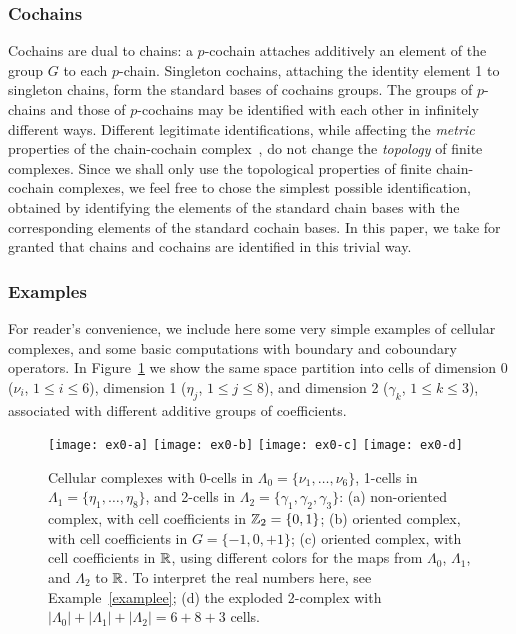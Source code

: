 \subsubsection{{Cochains}}
\label{sec:cochains}

          Cochains are dual to {chains}: a $p$-cochain attaches additively an element of the group $G$ to each $p$-chain. Singleton cochains, attaching the identity element 1 to {singleton chains}, form the standard bases of cochains groups. The groups of $p$-chains and those of $p$-cochains may be identified with each other in {infinitely different ways}. Different legitimate identifications, while affecting the \emph{metric} properties of the chain-cochain complex~\cite{DiCarlo:2009:DPU:1629255.1629273}, do not change the \emph{topology} of finite complexes. Since we shall only use the topological properties of finite chain-cochain complexes, we feel free to chose the simplest possible identification, obtained by identifying the elements of the standard chain bases with the corresponding elements of the standard cochain bases. In this paper, we take for granted that chains and cochains are identified in this trivial way.

\subsubsection{{Examples}}

{
For reader's convenience, we include here some very simple examples of cellular complexes, and some basic computations with boundary and coboundary operators. In Figure~\ref{fig:ex0-abc} we show the same space partition into cells of dimension 0 ($\nu_i$, $1\leq i\leq 6$), dimension 1 ($\eta_j$, $1\leq j\leq 8$), and dimension 2 ($\gamma_k$, $1\leq k\leq 3$), associated with different additive groups of coefficients.
}

\begin{figure}[htbp] %
   \centering
   \texttt{[image: ex0-a]}
   \hfill
   \texttt{[image: ex0-b]}
   \hfill
   \texttt{[image: ex0-c]}
   \hfill
   \texttt{[image: ex0-d]}
   \caption{{
Cellular complexes with 0-cells {in} $\Lambda_0=\{\nu_1, \ldots, \nu_6\}$,  1-cells {in} $\Lambda_1=\{\eta_1, \ldots, \eta_8\}$, and 2-cells {in} $\Lambda_2=\{\gamma_1, \gamma_2, \gamma_3\}$: (a) non-oriented complex, with cell coefficients in $\mathbb{Z}_2=\{0,1\}$; (b) oriented complex, with cell coefficients in $G=\{-1,0,+1\}$; (c) oriented complex, with cell coefficients in $\mathbb{R}$, using different colors for the maps from $\Lambda_0$,  $\Lambda_1$, and  $\Lambda_2$ to $\mathbb{R}$. To interpret the real numbers here, see Example~\ref{examplee}; (d) the exploded 2-complex with $|\Lambda_0| + |\Lambda_1| + |\Lambda_2| = 6+8+3$ cells.}
}
   \label{fig:ex0-abc}
\end{figure}


